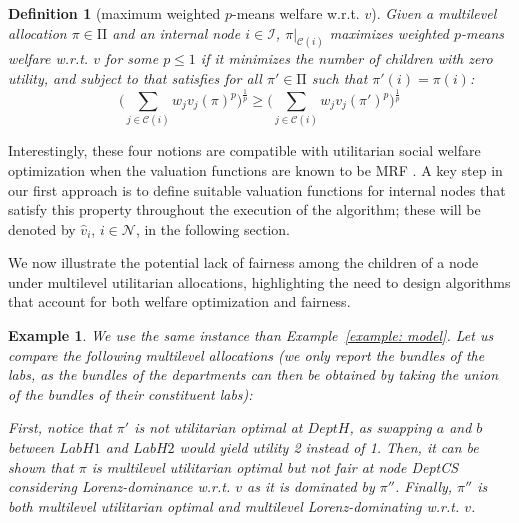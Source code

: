 \documentclass[]{article}
\newtheorem{definition}{Definition}
\newtheorem{example}{Example}
\newcommand{\nodes}{\mathcal{N}}
\newcommand{\children}{\mathcal{C}}
\newcommand{\internal}{\mathcal{I}}
\newcommand{\mallocations}{\mathrm{\Pi}}
\begin{document}
\begin{definition}[maximum weighted $p$-means welfare w.r.t. $v$] Given a multilevel allocation $\pi \in \mallocations$ and an internal node $i \in \internal$, $\pi \vert_{\children(i)}$ \emph{maximizes weighted $p$-means welfare w.r.t. $v$} for some $p \leq 1$ if it minimizes the number of children with zero utility, and subject to that satisfies for all $\pi' \in \mallocations$ such that $\pi'(i) = \pi(i)$:
$$
\Big (\sum_{j \in \children(i)} w_{j} v_{j}(\pi)^p \Big )^{\frac{1}{p}} \geq \Big (\sum_{j  \in \children(i)}  w_{j}  v_{j}(\pi')^p \Big )^{\frac{1}{p}}$$
\end{definition}

Interestingly, these four notions are compatible with utilitarian social welfare optimization when the valuation functions are known to be MRF \cite{Benabbou_et_al2021, Viswanathan_Zick2023b}. A key step in our first approach is to define suitable valuation functions for internal nodes that satisfy this property throughout the execution of the algorithm; these will be denoted by $\hat{v}_i$, $i\in \nodes$, in the following section. 

\medskip

We now illustrate the potential lack of fairness among the children of a node under multilevel utilitarian allocations, highlighting the need to design algorithms that account for both welfare optimization and fairness.


\begin{example} \label{example2}
   We use the same instance than Example~\ref{example: model}. Let us compare the following multilevel allocations (we only report the bundles of the labs, as the bundles of the departments can then be obtained by taking the union of the bundles of their constituent labs): 

\vspace{0.1cm}

\noindent
\begin{center}
\end{center}
\vspace{0.1cm}

\noindent First, notice that $\pi'$ is not utilitarian optimal at $DeptH$, as swapping $a$ and $b$ between $LabH1$ and $LabH2$ would yield utility 2 instead of 1. Then, it can be shown that 
$\pi$ is multilevel utilitarian optimal but not fair at node DeptCS considering Lorenz-dominance w.r.t. $v$ as it is dominated by $\pi''$. Finally, $\pi''$ is both multilevel utilitarian optimal and multilevel Lorenz-dominating w.r.t. $v$.

\end{example}
\end{document}
